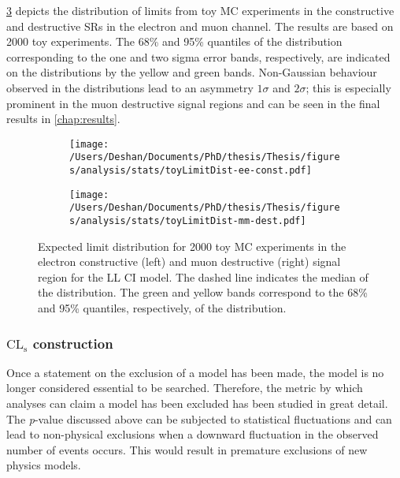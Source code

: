 \cref{fig:toyDist} depicts the distribution of limits from toy MC experiments in the constructive and destructive SRs in the electron and muon channel. The results are based on 2000 toy experiments. The 68\% and 95\% quantiles of the distribution corresponding to the one and two sigma error bands, respectively, are indicated on the distributions by the yellow and green bands. Non-Gaussian behaviour observed in the distributions lead to an asymmetry $1\sigma$ and $2\sigma$; this is especially prominent in the muon destructive signal regions and can be seen in the final 
results in \cref{chap:results}. 

\begin{figure}[!htpb]
    \centering
    \begin{subfigure}[b]{0.49\textwidth}
        \centering
        \texttt{[image: /Users/Deshan/Documents/PhD/thesis/Thesis/figures/analysis/stats/toyLimitDist-ee-const.pdf]}
        \label{fig:toyDist1}
    \end{subfigure}
    \begin{subfigure}[b]{0.49\textwidth}
        \centering
        \texttt{[image: /Users/Deshan/Documents/PhD/thesis/Thesis/figures/analysis/stats/toyLimitDist-mm-dest.pdf]}
        \label{fig:toyDist2}
    \end{subfigure}
    \caption[Expected limit distribution for 2000 toy MC experiments.]{Expected limit distribution for 2000 toy MC experiments in the electron constructive (left) and muon destructive (right) signal region for the LL CI model. The dashed line indicates the median of the distribution. The green and yellow bands correspond to the 68\% and 95\% quantiles, respectively, of the distribution.}
    \label{fig:toyDist}
\end{figure}

\subsubsection{$\mathrm{CL}_\mathrm{s}$ construction}
Once a statement on the exclusion of a model has been made, the model is no longer considered essential to be searched. Therefore, the metric by which analyses can claim a model has been excluded has been studied in great detail. The \emph{p}-value discussed above can be subjected to statistical fluctuations and can lead to non-physical exclusions when a downward fluctuation in the observed number of events occurs. This would result in premature exclusions of new physics models. 

